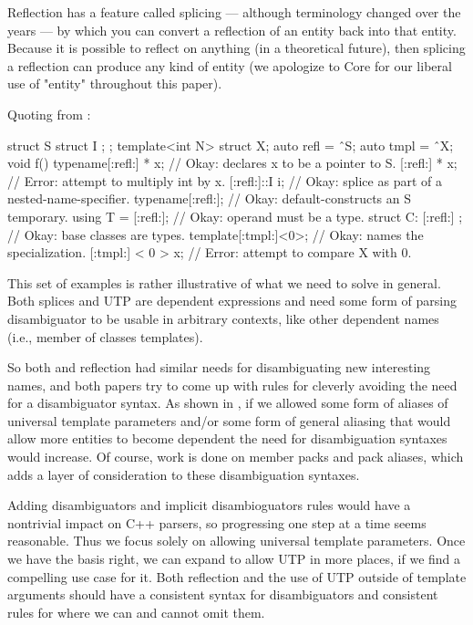 \documentclass{wg21}
\begin{document}
Reflection has a feature called splicing --- although terminology changed over the years --- by which you can convert a reflection of an entity
back into that entity. Because it is possible to reflect on anything (in a theoretical future), then splicing a reflection
can produce any kind of entity (we apologize to Core for our liberal use of "entity" throughout this paper).

Quoting from :

\begin{quoteblock}
\begin{colorblock}
struct S { struct I { }; };
template<int N> struct X;
auto refl = ˆS;
auto tmpl = ˆX;
void f() {
    typename[:refl:] * x; // Okay: declares x to be a pointer to S.
    [:refl:] * x; // Error: attempt to multiply int by x.
    [:refl:]::I i; // Okay: splice as part of a nested-name-specifier.
    typename[:refl:]{}; // Okay: default-constructs an S temporary.
    using T = [:refl:]; // Okay: operand must be a type.
    struct C: [:refl:] {}; // Okay: base classes are types.
    template[:tmpl:]<0>; // Okay: names the specialization.
    [:tmpl:] < 0 > x; // Error: attempt to compare X with 0.
}
\end{colorblock}
\end{quoteblock}

This set of examples is rather illustrative of what we need to solve in general.
Both splices and UTP are dependent expressions and need some form of parsing disambiguator to be usable
in arbitrary contexts, like other dependent names (i.e., member of classes templates).

So both  and reflection had similar needs for disambiguating new interesting names, and
both papers try to come up with rules for cleverly avoiding the need for a disambiguator syntax.
As shown in , if we allowed some form of aliases of universal template parameters and/or some form of general aliasing that would allow more entities to become dependent
the need for disambiguation syntaxes would increase.
Of course, work is done on member packs and pack aliases, which adds a layer of consideration to these disambiguation syntaxes.

Adding disambiguators and implicit disambioguators rules would have a nontrivial impact on C++ parsers, so progressing one step at a time seems reasonable.
Thus we focus solely on allowing universal template parameters. Once we have the basis right, we can expand to
allow UTP in more places, if we find a compelling use case for it. Both reflection and the use of UTP outside of template arguments should have a consistent syntax for disambiguators and consistent rules for where we can and cannot omit them.
\end{document}

